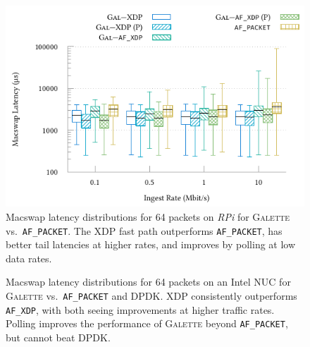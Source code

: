 \documentclass[comsoc, conference, times]{IEEEtran}
\newcommand{\ourtech}{\textsc{Galette}}
\newcommand{\afxdp}{\texttt{AF\_XDP}}
\newcommand{\afp}{\texttt{AF\_PACKET}}
\begin{document}
\begin{figure}
	\centering
	\includegraphics[keepaspectratio,width=\resultplotwidth]{../plots/build/latency-vs-baselines/rpi-64B-trimlog-new}
	\caption{Macswap latency distributions for \qty{64}{\byte} packets on \emph{RPi} for \ourtech{} vs.\ \afp{}. The XDP fast path outperforms \afp{}, has better tail latencies at higher rates, and improves by polling at low data rates.\label{fig:lat-rpi}}
\end{figure}

\begin{figure}
	\centering
	
	\caption{Macswap latency distributions for \qty{64}{\byte} packets on an Intel NUC for \ourtech{} vs.\ \afp{} and DPDK. XDP consistently outperforms \afxdp{}, with both seeing improvements at higher traffic rates. Polling improves the performance of \ourtech{} beyond \afp{}, but cannot beat DPDK.\label{fig:lat-nuc}}
\end{figure}
\end{document}
